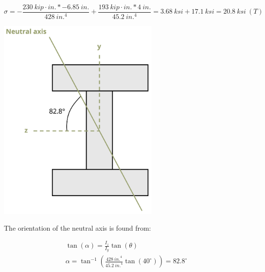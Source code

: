 \documentclass[
  letterpaper,
  DIV=11,
  numbers=noendperiod]{scrreprt}
\theoremstyle{definition}
\theoremstyle{remark}
\begin{document}
\begin{tcolorbox}
\begin{tcolorbox}
\[
\sigma=-\frac{230{~kip}\cdot{in.} *-6.85{~in.}}{428{~in.}^4}+\frac{193{~kip}\cdot{in.} * 4{~in.}}{45.2{~in.}^4}=3.68{~ksi}+17.1{~ksi}=20.8{~ksi}~(T)
\]

\begin{center}
\includegraphics[width=3.16667in,height=\textheight]{images/CH9 PNGs/Example 9.6 part 3.png}
\end{center}

The orientation of the neutral axis is found from:

\[
\begin{gathered}
\tan (\alpha)=\frac{I_z}{I_y} \tan (\theta) \\
\alpha=\tan ^{-1}\left(\frac{428{~in.}^4}{45.2{~in.}^4} \tan \left(40^{\circ}\right)\right)=82.8^{\circ}
\end{gathered}
\]

\end{tcolorbox}

\end{tcolorbox}
\end{document}
